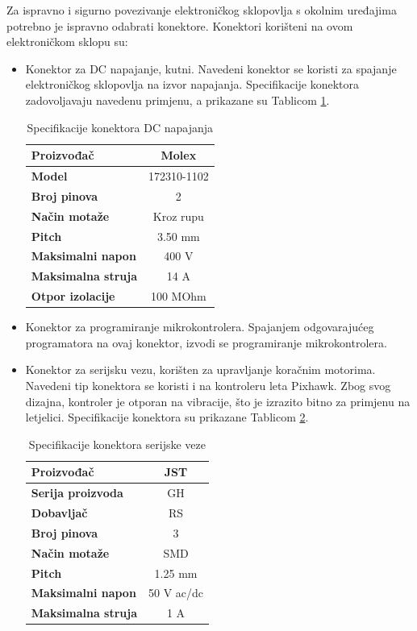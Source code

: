 \documentclass[11pt,a4paper]{article}
\begin{document}
Za ispravno i sigurno povezivanje elektroničkog sklopovlja s okolnim uređajima potrebno je ispravno odabrati konektore. Konektori korišteni na ovom elektroničkom sklopu su:
\begin{center}
	\begin{itemize}
		\item Konektor za DC napajanje, kutni. Navedeni konektor se koristi za spajanje elektroničkog sklopovlja na izvor napajanja. Specifikacije konektora zadovoljavaju navedenu primjenu, a prikazane su Tablicom \ref{tab:specifikacija_supply_connector}.
		
\begin{table}[H]
	\centering
	\caption{Specifikacije konektora DC napajanja}
	\label{tab:specifikacija_supply_connector}
	\begin{tabular}{|l|c|}
		\hline
		\textbf{Proizvođač} & Molex \\ \hline 
		\textbf{Model} & 172310-1102 \\ \hline 
		\textbf{Broj pinova} & 2 \\ \hline 
		\textbf{Način motaže} & Kroz rupu    \\ \hline
		\textbf{Pitch} & 3.50 mm    \\ \hline 
		\textbf{Maksimalni napon} & 400 V \\ \hline 
		\textbf{Maksimalna struja} & 14 A \\ \hline
		\textbf{Otpor izolacije} & 100 MOhm \\ \hline
	\end{tabular}
\end{table}		
		
		\item Konektor za programiranje mikrokontrolera. Spajanjem odgovarajućeg programatora na ovaj konektor, izvodi se programiranje mikrokontrolera.
		
		\item Konektor za serijsku vezu, korišten za upravljanje koračnim motorima. Navedeni tip konektora se koristi i na kontroleru leta Pixhawk. Zbog svog dizajna, kontroler je otporan na vibracije, što je izrazito bitno za primjenu na letjelici. Specifikacije konektora su prikazane Tablicom \ref{tab:specifikacija_connector_serial}.
		
\begin{table}[H]
	\centering
	\caption{Specifikacije konektora serijske veze}
	\label{tab:specifikacija_connector_serial}
	\begin{tabular}{|l|c|}
		\hline
		\textbf{Proizvođač} & JST \\ \hline 
		\textbf{Serija proizvoda} & GH \\ \hline 
		\textbf{Dobavljač} & RS \\ \hline 
		\textbf{Broj pinova} & 3 \\ \hline 
		\textbf{Način motaže} & SMD    \\ \hline
		\textbf{Pitch} & 1.25 mm    \\ \hline 
		\textbf{Maksimalni napon} & 50 V  ac/dc\\ \hline 
		\textbf{Maksimalna struja} & 1 A \\ \hline
	\end{tabular}
\end{table}		


\end{itemize}
\end{center}
\end{document}
